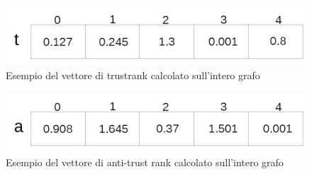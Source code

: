 \begin{figure}
\centering
 \includegraphics{immagini/test/trustVettore}
 \caption{Esempio del vettore di trustrank calcolato sull'intero grafo}
 \label{fig:tVettore}
\end{figure}
\begin{figure}
\centering
 \includegraphics{immagini/test/immagineAntiTrust}
 \caption{Esempio del vettore di anti-trust rank calcolato sull'intero grafo}
 \label{fig:aVettore}
\end{figure}

